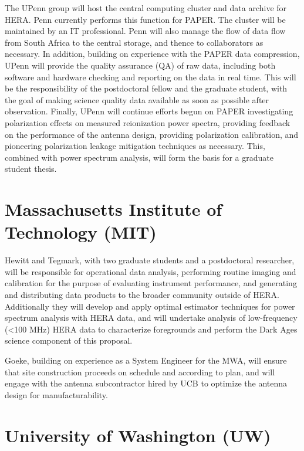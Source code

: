 \documentclass[preprint]{aastex}
\begin{document}
The UPenn group will host the central computing
cluster and data archive for HERA. Penn currently performs this function for
PAPER. The cluster will be maintained by an IT professional. Penn will also
manage the flow of data flow from South Africa to the central storage, and
thence to collaborators as necessary.  In addition, building on experience
with the PAPER data compression, UPenn will provide the quality
assurance (QA) of raw data, including both software and hardware checking and
reporting on the data in real time. This will be the responsibility of the
postdoctoral fellow and the graduate student, with the goal of making science
quality data available as soon as possible after observation.  
Finally, UPenn will continue efforts begun on PAPER
investigating polarization effects on measured reionization power spectra,
providing feedback on the performance of the antenna design, providing
polarization calibration, and pioneering polarization leakage mitigation
techniques as necessary. This, combined with power spectrum analysis, will form
the basis for a graduate student thesis.

\section*{Massachusetts Institute of Technology (MIT)}

Hewitt and Tegmark, with two graduate students and a postdoctoral
researcher, will be responsible for 
operational data analysis, performing routine imaging and calibration
for the purpose of evaluating instrument performance, and generating
and distributing data products to the broader community outside of HERA.
Additionally they will develop and apply optimal estimator techniques
for power spectrum analysis with HERA data, and will undertake analysis
of low-frequency (<100 MHz) HERA data to characterize foregrounds and
perform the Dark Ages science component of this proposal.

Goeke, building on experience as a System Engineer for the
MWA, will
ensure that site construction proceeds on schedule and according to plan,
and will engage with the antenna subcontractor hired by UCB to
optimize the antenna design for manufacturability.


\section*{University of Washington (UW)}
\end{document}
